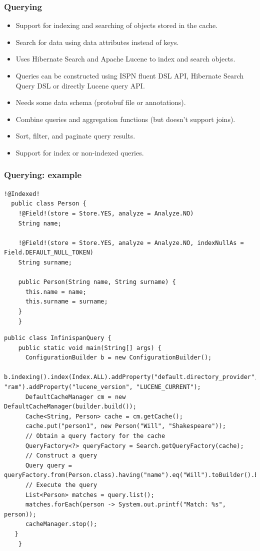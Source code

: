 \documentclass[10pt,utf8]{beamer}
\begin{document}
\begin{frame}
	\frametitle{Querying}
	\begin{itemize}
		\item Support for indexing and searching of objects stored in the cache.
		\pause
		\item Search for data using data attributes instead of keys.
		\pause
		\item Uses Hibernate Search and Apache Lucene to index and search objects.
		\pause
		\item Queries can be constructed using ISPN fluent DSL API, Hibernate Search Query DSL or directly Lucene query API.
		\pause
		\item Needs some data schema (protobuf file or annotations).
		\pause
		\item Combine queries and aggregation functions (but doesn't support joins).
		\pause
		\item Sort, filter, and paginate query results.
		\pause
		\item Support for index or non-indexed queries.
	\end{itemize}
\end{frame}

\begin{frame}[fragile]
	\frametitle{Querying: example}
	\begin{lstlisting}[style=Java]
  !@Indexed!
  public class Person {
    !@Field!(store = Store.YES, analyze = Analyze.NO)
    String name;

    !@Field!(store = Store.YES, analyze = Analyze.NO, indexNullAs = Field.DEFAULT_NULL_TOKEN)
    String surname;

    public Person(String name, String surname) {
      this.name = name;
      this.surname = surname;
    }
	}
	\end{lstlisting}
\end{frame}

\begin{frame}[fragile]
	\begin{lstlisting}[style=Java]
	public class InfinispanQuery {
    public static void main(String[] args) {
      ConfigurationBuilder b = new ConfigurationBuilder();
      b.indexing().index(Index.ALL).addProperty("default.directory_provider", "ram").addProperty("lucene_version", "LUCENE_CURRENT");
      DefaultCacheManager cm = new DefaultCacheManager(builder.build());
      Cache<String, Person> cache = cm.getCache();
      cache.put("person1", new Person("Will", "Shakespeare"));
      // Obtain a query factory for the cache
      QueryFactory<?> queryFactory = Search.getQueryFactory(cache);
      // Construct a query
      Query query = queryFactory.from(Person.class).having("name").eq("Will").toBuilder().build();
      // Execute the query
      List<Person> matches = query.list();
      matches.forEach(person -> System.out.printf("Match: %s", person));
      cacheManager.stop();
   }
	}
	\end{lstlisting}
\end{frame}
\end{document}
